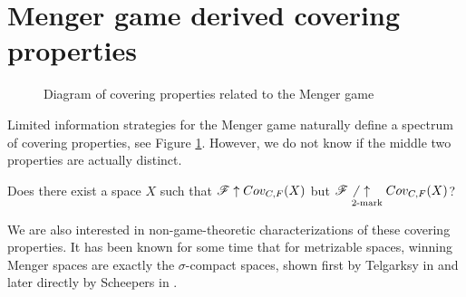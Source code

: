 \section{Menger game derived covering properties}

\begin{figure}[h]
\begin{center}
\end{center}
\caption{Diagram of covering properties related to the Menger game}
\label{menSpec}
\end{figure}

Limited information strategies for the Menger game naturally define a spectrum
of covering properties, see Figure \ref{menSpec}. However,
we do not know if the middle two properties are actually distinct.

\begin{ques}\label{perfectTo2Mark}
  Does there exist a space $X$ such that $\mathscr{F} \uparrow Cov_{C,F}(X)$ but
  $\mathscr{F} \not\underset{2\text{-mark}}{\uparrow} Cov_{C,F}(X)$?
\end{ques}

We are also interested in non-game-theoretic characterizations of these
covering properties. It has been known for some time that for metrizable spaces,
winning Menger spaces are exactly the $\sigma$-compact spaces, shown first
by Telgarksy in \cite{MR753073} and later directly by Scheepers in
\cite{MR1273523}.

